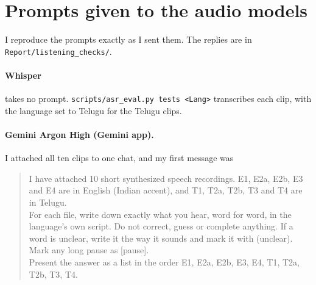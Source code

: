 \documentclass[11pt,a4paper]{article}
\newcommand{\code}[1]{\texttt{#1}}
\begin{document}
\section{Prompts given to the audio models}
\label{app:prompts}
I reproduce the prompts exactly as I sent them. The replies are in \code{Report/listening\_checks/}.

\paragraph{Whisper} takes no prompt. \code{scripts/asr\_eval.py tests <Lang>} transcribes each clip, with the
language set to Telugu for the Telugu clips.

\paragraph{Gemini Argon High (Gemini app).} I attached all ten clips to one chat, and my first message was
\begin{quote}\footnotesize\raggedright
I have attached 10 short synthesized speech recordings. E1, E2a, E2b, E3 and E4 are in English (Indian accent), and T1, T2a, T2b, T3 and T4 are in Telugu.\\
\medskip
For each file, write down exactly what you hear, word for word, in the language's own script. Do not correct, guess or complete anything. If a word is unclear, write it the way it sounds and mark it with (unclear). Mark any long pause as [pause].\\
\medskip
Present the answer as a list in the order E1, E2a, E2b, E3, E4, T1, T2a, T2b, T3, T4.\\
\end{quote}
\end{document}
